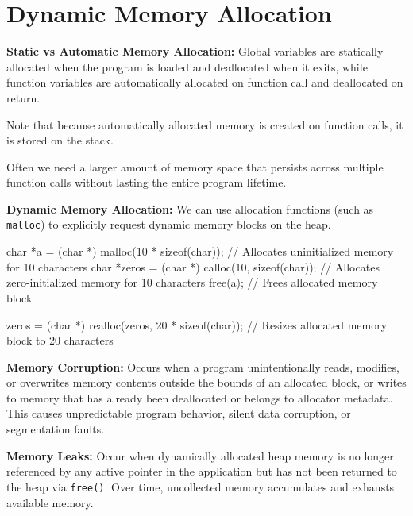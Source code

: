 \section{Dynamic Memory Allocation}

\begin{definition}
    \textbf{Static vs Automatic Memory Allocation:} Global variables are statically allocated when the program is loaded and deallocated when it exits, while function variables are automatically allocated on function call and deallocated on return.
\end{definition}

\begin{remark}
    Note that because automatically allocated memory is created on function calls, it is stored on the stack.
\end{remark}

\begin{remark}
    Often we need a larger amount of memory space that persists across multiple function calls without lasting the entire program lifetime.
\end{remark}

\begin{definition}
    \textbf{Dynamic Memory Allocation:} We can use allocation functions (such as \texttt{malloc}) to explicitly request dynamic memory blocks on the heap.
\end{definition}

\begin{codeexample}
char *a = (char *) malloc(10 * sizeof(char)); // Allocates uninitialized memory for 10 characters
char *zeros = (char *) calloc(10, sizeof(char)); // Allocates zero-initialized memory for 10 characters
free(a); // Frees allocated memory block

zeros = (char *) realloc(zeros, 20 * sizeof(char)); // Resizes allocated memory block to 20 characters
\end{codeexample}

\begin{definition}
    \textbf{Memory Corruption:} Occurs when a program unintentionally reads, modifies, or overwrites memory contents outside the bounds of an allocated block, or writes to memory that has already been deallocated or belongs to allocator metadata. This causes unpredictable program behavior, silent data corruption, or segmentation faults.
\end{definition}

\begin{definition}
    \textbf{Memory Leaks:} Occur when dynamically allocated heap memory is no longer referenced by any active pointer in the application but has not been returned to the heap via \texttt{free()}. Over time, uncollected memory accumulates and exhausts available memory.
\end{definition}


